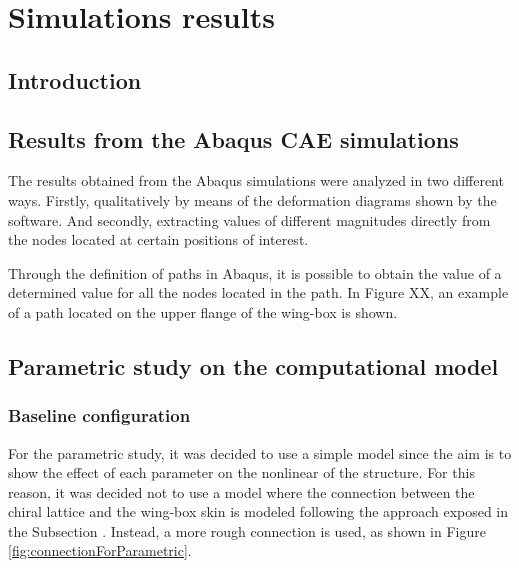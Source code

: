 \chapter{Simulations results} \label{chap:Results_sim}

\section{Introduction} \label{sec:intro_Results_sim}


\section{Results from the Abaqus CAE simulations} \label{sec:computationalParametricStudy_Results}

The results obtained from the Abaqus simulations were analyzed in two different ways. Firstly, qualitatively by means of the deformation diagrams shown by the software. And secondly, extracting values of different magnitudes directly from the nodes located at certain positions of interest.

Through the definition of paths in Abaqus, it is possible to obtain the value of a determined value for all the nodes located in the path. In Figure XX, an example of a path located on the upper flange of the wing-box is shown.



\section{Parametric study on the computational model} \label{sec:computationalParametricStudy_Results_sim}
%

\subsection{Baseline configuration} \label{sec:baselineConfig_Results_sim}

For the parametric study, it was decided to use a simple model since the aim is to show the effect of each parameter on the nonlinear of the structure. For this reason, it was decided not to use a model where the connection between the chiral lattice and the wing-box skin is modeled following the approach exposed in the Subsection \label{subsec:connections_computationalModel}. Instead, a more rough connection is used, as shown in Figure \ref{fig:connectionForParametric}. 

